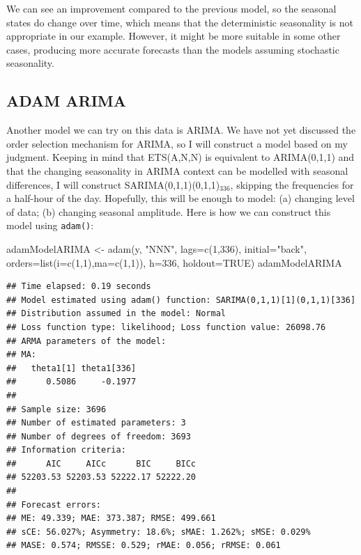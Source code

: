 \documentclass[
]{book}
\newenvironment{Shaded}{\begin{snugshade}}{\end{snugshade}}
\newcommand{\AttributeTok}[1]{\textcolor[rgb]{0.77,0.63,0.00}{#1}}
\newcommand{\ConstantTok}[1]{\textcolor[rgb]{0.00,0.00,0.00}{#1}}
\newcommand{\DecValTok}[1]{\textcolor[rgb]{0.00,0.00,0.81}{#1}}
\newcommand{\FunctionTok}[1]{\textcolor[rgb]{0.00,0.00,0.00}{#1}}
\newcommand{\NormalTok}[1]{#1}
\newcommand{\OtherTok}[1]{\textcolor[rgb]{0.56,0.35,0.01}{#1}}
\newcommand{\StringTok}[1]{\textcolor[rgb]{0.31,0.60,0.02}{#1}}
\theoremstyle{definition}
\theoremstyle{definition}
\theoremstyle{definition}
\theoremstyle{definition}
\theoremstyle{remark}
\begin{document}
We can see an improvement compared to the previous model, so the seasonal states do change over time, which means that the deterministic seasonality is not appropriate in our example. However, it might be more suitable in some other cases, producing more accurate forecasts than the models assuming stochastic seasonality.

\hypertarget{adam-arima}{%
\subsection{ADAM ARIMA}\label{adam-arima}}

Another model we can try on this data is ARIMA. We have not yet discussed the order selection mechanism for ARIMA, so I will construct a model based on my judgment. Keeping in mind that ETS(A,N,N) is equivalent to ARIMA(0,1,1) and that the changing seasonality in ARIMA context can be modelled with seasonal differences, I will construct SARIMA(0,1,1)(0,1,1)\(_{336}\), skipping the frequencies for a half-hour of the day. Hopefully, this will be enough to model: (a) changing level of data; (b) changing seasonal amplitude. Here is how we can construct this model using \texttt{adam()}:

\begin{Shaded}
\begin{Highlighting}[]
\NormalTok{adamModelARIMA }\OtherTok{\textless{}{-}} \FunctionTok{adam}\NormalTok{(y, }\StringTok{"NNN"}\NormalTok{, }\AttributeTok{lags=}\FunctionTok{c}\NormalTok{(}\DecValTok{1}\NormalTok{,}\DecValTok{336}\NormalTok{), }\AttributeTok{initial=}\StringTok{"back"}\NormalTok{,}
                       \AttributeTok{orders=}\FunctionTok{list}\NormalTok{(}\AttributeTok{i=}\FunctionTok{c}\NormalTok{(}\DecValTok{1}\NormalTok{,}\DecValTok{1}\NormalTok{),}\AttributeTok{ma=}\FunctionTok{c}\NormalTok{(}\DecValTok{1}\NormalTok{,}\DecValTok{1}\NormalTok{)),}
                       \AttributeTok{h=}\DecValTok{336}\NormalTok{, }\AttributeTok{holdout=}\ConstantTok{TRUE}\NormalTok{)}
\NormalTok{adamModelARIMA}
\end{Highlighting}
\end{Shaded}

\begin{verbatim}
## Time elapsed: 0.19 seconds
## Model estimated using adam() function: SARIMA(0,1,1)[1](0,1,1)[336]
## Distribution assumed in the model: Normal
## Loss function type: likelihood; Loss function value: 26098.76
## ARMA parameters of the model:
## MA:
##   theta1[1] theta1[336] 
##      0.5086     -0.1977 
## 
## Sample size: 3696
## Number of estimated parameters: 3
## Number of degrees of freedom: 3693
## Information criteria:
##      AIC     AICc      BIC     BICc 
## 52203.53 52203.53 52222.17 52222.20 
## 
## Forecast errors:
## ME: 49.339; MAE: 373.387; RMSE: 499.661
## sCE: 56.027%; Asymmetry: 18.6%; sMAE: 1.262%; sMSE: 0.029%
## MASE: 0.574; RMSSE: 0.529; rMAE: 0.056; rRMSE: 0.061
\end{verbatim}
\end{document}
